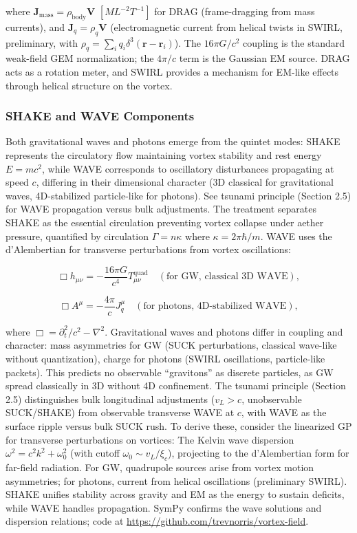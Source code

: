 where $\mathbf{J}_{\text{mass}} = \rho_{\text{body}} \mathbf{V}$ $[M L^{-2} T^{-1}]$ for DRAG (frame-dragging from mass currents), and $\mathbf{J}_q = \rho_q \mathbf{V}$ (electromagnetic current from helical twists in SWIRL, preliminary, with $\rho_q = \sum_i q_i \delta^3(\mathbf{r} - \mathbf{r}_i)$). The $16\pi G/c^2$ coupling is the standard weak-field GEM normalization; the $4\pi/c$ term is the Gaussian EM source. DRAG acts as a rotation meter, and SWIRL provides a mechanism for EM-like effects through helical structure on the vortex.

\subsubsection{SHAKE and WAVE Components}

Both gravitational waves and photons emerge from the quintet modes: SHAKE represents the circulatory flow maintaining vortex stability and rest energy $E = m c^2$, while WAVE corresponds to oscillatory disturbances propagating at speed $c$, differing in their dimensional character (3D classical for gravitational waves, 4D-stabilized particle-like for photons). See tsunami principle (Section 2.5) for WAVE propagation versus bulk adjustments. The treatment separates SHAKE as the essential circulation preventing vortex collapse under aether pressure, quantified by circulation $\Gamma = n \kappa$ where $\kappa = 2 \pi \hbar / m$. WAVE uses the d'Alembertian for transverse perturbations from vortex oscillations:

\begin{equation}
\Box h_{\mu\nu} = -\frac{16\pi G}{c^4} T_{\mu\nu}^{\text{quad}} \quad (\text{for GW, classical 3D WAVE}),
\end{equation}

\begin{equation}
\Box A^\mu = -\frac{4\pi}{c} J_q^\mu \quad (\text{for photons, 4D-stabilized WAVE}),
\end{equation}

where $\Box = \partial_t^2 / c^2 - \nabla^2$. Gravitational waves and photons differ in coupling and character: mass asymmetries for GW (SUCK perturbations, classical wave-like without quantization), charge for photons (SWIRL oscillations, particle-like packets). This predicts no observable ``gravitons'' as discrete particles, as GW spread classically in 3D without 4D confinement. The tsunami principle (Section 2.5) distinguishes bulk longitudinal adjustments ($v_L > c$, unobservable SUCK/SHAKE) from observable transverse WAVE at $c$, with WAVE as the surface ripple versus bulk SUCK rush. To derive these, consider the linearized GP for transverse perturbations on vortices: The Kelvin wave dispersion $\omega^2 = c^2 k^2 + \omega_0^2$ (with cutoff $\omega_0 \sim v_L / \xi_c$), projecting to the d'Alembertian form for far-field radiation. For GW, quadrupole sources arise from vortex motion asymmetries; for photons, current from helical oscillations (preliminary SWIRL). SHAKE unifies stability across gravity and EM as the energy to sustain deficits, while WAVE handles propagation. SymPy confirms the wave solutions and dispersion relations; code at \url{https://github.com/trevnorris/vortex-field}.

